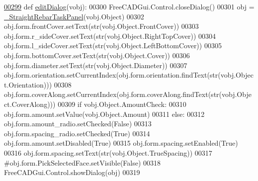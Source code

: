 \begin{DoxyCode}
\hypertarget{namespaceStraightRebar.tex_l00299}{}\hyperlink{namespaceStraightRebar_ad48f93922ce90bb63d051c7c3c794d35}{00299} \textcolor{keyword}{def }\hyperlink{namespaceStraightRebar_ad48f93922ce90bb63d051c7c3c794d35}{editDialog}(vobj):
00300     FreeCADGui.Control.closeDialog()
00301     obj = \hyperlink{classStraightRebar_1_1__StraightRebarTaskPanel}{\_StraightRebarTaskPanel}(vobj.Object)
00302     obj.form.frontCover.setText(str(vobj.Object.FrontCover))
00303     obj.form.r\_sideCover.setText(str(vobj.Object.RightTopCover))
00304     obj.form.l\_sideCover.setText(str(vobj.Object.LeftBottomCover))
00305     obj.form.bottomCover.setText(str(vobj.Object.Cover))
00306     obj.form.diameter.setText(str(vobj.Object.Diameter))
00307     obj.form.orientation.setCurrentIndex(obj.form.orientation.findText(str(vobj.Object.Orientation)))
00308     obj.form.coverAlong.setCurrentIndex(obj.form.coverAlong.findText(str(vobj.Object.CoverAlong)))
00309     \textcolor{keywordflow}{if} vobj.Object.AmountCheck:
00310         obj.form.amount.setValue(vobj.Object.Amount)
00311     \textcolor{keywordflow}{else}:
00312         obj.form.amount\_radio.setChecked(\textcolor{keyword}{False})
00313         obj.form.spacing\_radio.setChecked(\textcolor{keyword}{True})
00314         obj.form.amount.setDisabled(\textcolor{keyword}{True})
00315         obj.form.spacing.setEnabled(\textcolor{keyword}{True})
00316         obj.form.spacing.setText(str(vobj.Object.TrueSpacing))
00317     \textcolor{comment}{#obj.form.PickSelectedFace.setVisible(False)}
00318     FreeCADGui.Control.showDialog(obj)
00319 
\end{DoxyCode}
